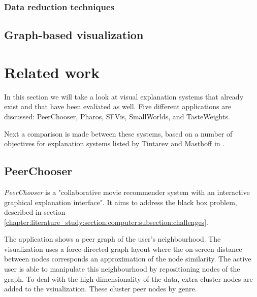 \subsubsection{Data reduction techniques}\label{chapter:literature_study:section:interaction:subsection:techniques:subsubsection:reduction}




\subsection{Graph-based visualization}\label{chapter:literature_study:section:interaction:subsection:graphs}







% 
\section{Related work}\label{chapter:survey:section:applications}

In this section we will take a look at visual explanation systems that already exist and that have been evaliated as well. Five different applications are discussed: PeerChooser, Pharos, SFVis, SmallWorlds, and TasteWeights.

Next a comparison is made between these systems, based on a number of objectives for explanation systems listed by Tintarev and Masthoff in \cite{tintarev:2007:SER:1547550.1547664}.


\subsection{PeerChooser}\label{chapter:survey:section:applications:subsection:peerchooser}

\emph{PeerChooser} is a "collaborative movie recommender system with an interactive graphical explanation interface"\cite{odonovan:2008}. It aims to address the black box problem, described in section \ref{chapter:literature_study:section:computer:subsection:challenges}\cite{odonovan:2008}.

The application shows a peer graph of the user's neighbourhood. The visualization uses a force-directed graph layout where the on-screen distance between nodes corresponds an approximation of the node similarity. The active user is able to manipulate this neighbourhood by repositioning nodes of the graph. To deal with the high dimensionality of the data, extra cluster nodes are added to the vsiualization. These cluster peer nodes by genre\cite{odonovan:2008}.

